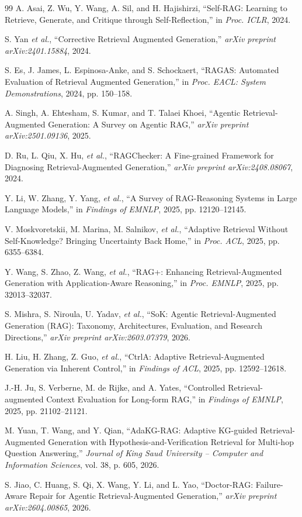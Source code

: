 \documentclass[conference]{IEEEtran}
\begin{document}
\begin{thebibliography}{99}
A. Asai, Z. Wu, Y. Wang, A. Sil, and H. Hajishirzi, ``Self-RAG: Learning to Retrieve,
Generate, and Critique through Self-Reflection,'' in \emph{Proc. ICLR}, 2024.

S. Yan \emph{et al.}, ``Corrective Retrieval Augmented Generation,'' \emph{arXiv
preprint arXiv:2401.15884}, 2024.

S. Es, J. James, L. Espinosa-Anke, and S. Schockaert, ``RAGAS: Automated Evaluation of
Retrieval Augmented Generation,'' in \emph{Proc. EACL: System Demonstrations}, 2024,
pp. 150--158.

A. Singh, A. Ehtesham, S. Kumar, and T. Talaei Khoei, ``Agentic Retrieval-Augmented
Generation: A Survey on Agentic RAG,'' \emph{arXiv preprint arXiv:2501.09136}, 2025.

D. Ru, L. Qiu, X. Hu, \emph{et al.}, ``RAGChecker: A Fine-grained Framework for
Diagnosing Retrieval-Augmented Generation,'' \emph{arXiv preprint arXiv:2408.08067},
2024.

Y. Li, W. Zhang, Y. Yang, \emph{et al.}, ``A Survey of RAG-Reasoning Systems in Large
Language Models,'' in \emph{Findings of EMNLP}, 2025, pp. 12120--12145.

V. Moskvoretskii, M. Marina, M. Salnikov, \emph{et al.}, ``Adaptive Retrieval Without
Self-Knowledge? Bringing Uncertainty Back Home,'' in \emph{Proc. ACL}, 2025,
pp. 6355--6384.

Y. Wang, S. Zhao, Z. Wang, \emph{et al.}, ``RAG+: Enhancing Retrieval-Augmented
Generation with Application-Aware Reasoning,'' in \emph{Proc. EMNLP}, 2025,
pp. 32013--32037.

S. Mishra, S. Niroula, U. Yadav, \emph{et al.}, ``SoK: Agentic Retrieval-Augmented
Generation (RAG): Taxonomy, Architectures, Evaluation, and Research Directions,''
\emph{arXiv preprint arXiv:2603.07379}, 2026.

H. Liu, H. Zhang, Z. Guo, \emph{et al.}, ``CtrlA: Adaptive Retrieval-Augmented
Generation via Inherent Control,'' in \emph{Findings of ACL}, 2025, pp. 12592--12618.

J.-H. Ju, S. Verberne, M. de Rijke, and A. Yates, ``Controlled Retrieval-augmented
Context Evaluation for Long-form RAG,'' in \emph{Findings of EMNLP}, 2025,
pp. 21102--21121.

M. Yuan, T. Wang, and Y. Qian, ``AdaKG-RAG: Adaptive KG-guided Retrieval-Augmented
Generation with Hypothesis-and-Verification Retrieval for Multi-hop Question
Answering,'' \emph{Journal of King Saud University -- Computer and Information
Sciences}, vol. 38, p. 605, 2026.

S. Jiao, C. Huang, S. Qi, X. Wang, Y. Li, and L. Yao, ``Doctor-RAG: Failure-Aware
Repair for Agentic Retrieval-Augmented Generation,'' \emph{arXiv preprint
arXiv:2604.00865}, 2026.

\end{thebibliography}
\end{document}
